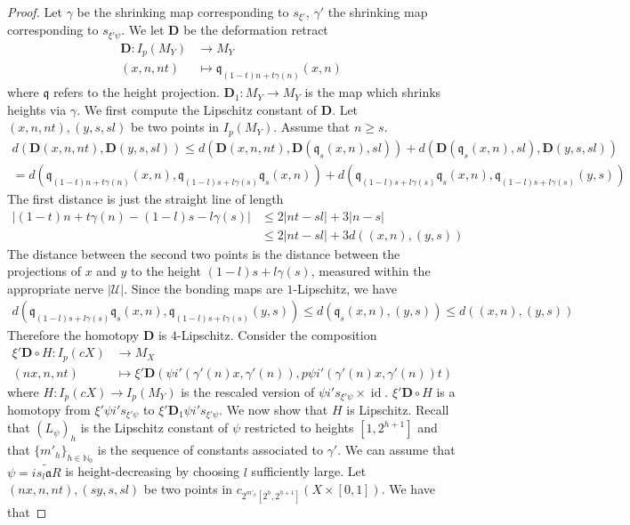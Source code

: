 \documentclass[a4paper,11pt]{article}
\theoremstyle{definition}
\theoremstyle{plain}
\theoremstyle{remark}
\DeclareMathOperator{\id}{id}
\begin{document}
{\begin{proof}
Let $\gamma$ be the shrinking map corresponding to $s_{\xi'}$, $\gamma'$ the shrinking map corresponding to $s_{\xi' \psi}$. We let $\mathbf{D}$ be the deformation retract
\begin{align*}
\mathbf{D}: I_{p}(M_{Y})&\rightarrow M_{Y}\\
(x,n,nt)&\mapsto \mathfrak{q}_{(1-t)n + t\gamma(n)}(x,n)
\end{align*}
where $\mathfrak{q}$ refers to the height projection. $\mathbf{D}_{1}: M_{Y} \rightarrow M_{Y}$ is the map which shrinks heights via $\gamma$. We first compute the Lipschitz constant of $\mathbf{D}$. Let $(x,n,nt),(y,s,sl)$ be two points in $I_{p}(M_{Y})$. Assume that $n\geq s$. 
\begin{align*}
d(\mathbf{D}(x,n,nt),\mathbf{D}(y,s,sl)) \leq d(\mathbf{D}(x,n,nt),\mathbf{D}(\mathfrak{q}_{s}(x,n),sl)) + d(\mathbf{D}(\mathfrak{q}_{s}(x,n),sl),\mathbf{D}(y,s,sl))\\
=d(\mathfrak{q}_{(1-t)n + t\gamma(n)}(x,n), \mathfrak{q}_{(1-l)s + l\gamma(s)}\mathfrak{q}_{s}(x,n)) +d(\mathfrak{q}_{(1-l)s + l\gamma(s)}\mathfrak{q}_{s}(x,n), \mathfrak{q}_{(1-l)s + l\gamma(s)}(y,s))
\end{align*} 
The first distance is just the straight line of length
\begin{align*}
|(1-t)n +t \gamma(n)-(1-l)s - l\gamma(s)| &\leq 2|nt-sl| + 3|n-s|\\
&\leq 2|nt-sl| + 3d((x,n),(y,s))
\end{align*} 
The distance between the second two points is the distance between the projections of $x$ and $y$ to the height $(1-l)s + l\gamma(s)$, measured within the appropriate nerve $|\mathcal{U}|$. Since the bonding maps are $1$-Lipschitz, we have
\begin{align*}
d(\mathfrak{q}_{(1-l)s + l\gamma(s)}\mathfrak{q}_{s}(x,n), \mathfrak{q}_{(1-l)s + l\gamma(s)}(y,s)) \leq d(\mathfrak{q}_{s}(x,n),(y,s)) \leq d((x,n),(y,s))
\end{align*}
Therefore the homotopy $\mathbf{D}$ is $4$-Lipschitz. Consider the composition 
\begin{align*}
\xi'  \mathbf{D}\circ H: I_{p}(cX)&\rightarrow M_{X}\\
(nx,n,nt)&\mapsto \xi' \mathbf{D}(\psi i'(\gamma'(n) x, \gamma'(n)), p\psi i'(\gamma'(n) x, \gamma'(n)) t)
\end{align*}
where $H: I_{p}(cX)\rightarrow I_{p}(M_{Y})$ is the rescaled version of $\psi i' s_{\xi' \psi}\times \id$. $\xi'  \mathbf{D}\circ H$ is a homotopy from $\xi' \psi i' s_{\xi' \psi}$ to  $\xi' \mathbf{D}_{1} \psi i' s_{\xi' \psi}$. We now show that $H$ is Lipschitz. Recall that $(L_{\psi})_{h}$ is the Lipschitz constant of $\psi$ restricted to heights $[1,2^{h+1}]$ and that $\{m'_{h}\}_{h\in \mathbb{N}_0}$ is the sequence of constants associated to $\gamma'$.  We can assume that $\psi = \widetilde{is_{l}\mathfrak{a}R}$ is height-decreasing by choosing $l$ sufficiently large. Let $(nx,n,nt),(sy,s,sl)$ be two points in $c_{ 2^{m'_{h}}[2^h,2^{h+1}]}(X \times [0,1])$. We have that

\end{proof}}
\end{document}
